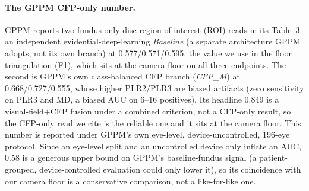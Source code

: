 \paragraph{The GPPM CFP-only number.} GPPM \citep{zheng2025gppm} reports two fundus-only disc region-of-interest (ROI) reads in its Table~3:
an independent evidential-deep-learning \emph{Baseline} (a separate architecture GPPM adopts, not its own branch) at
\num{0.577}/\num{0.571}/\num{0.595}, the value we use in the floor triangulation (F1), which sits at the camera floor on
all three endpoints. The second is GPPM's own class-balanced CFP branch (\emph{CFP\_M}) at \num{0.668}/\num{0.727}/\num{0.555},
whose higher PLR2/PLR3 are biased artifacts (zero sensitivity on PLR3 and MD, a biased AUC on 6--16 positives). Its headline \num{0.849} is a visual-field$+$CFP fusion under a combined criterion, not a CFP-only result, so
the CFP-only read we cite is the reliable one and it sits at the camera floor. This number is reported under GPPM's own
eye-level, device-uncontrolled, 196-eye protocol. Since an eye-level split and an uncontrolled device only inflate an
AUC, \num{0.58} is a generous upper bound on GPPM's baseline-fundus signal (a patient-grouped, device-controlled
evaluation could only lower it), so its coincidence with our camera floor is a conservative comparison,
not a like-for-like one.

